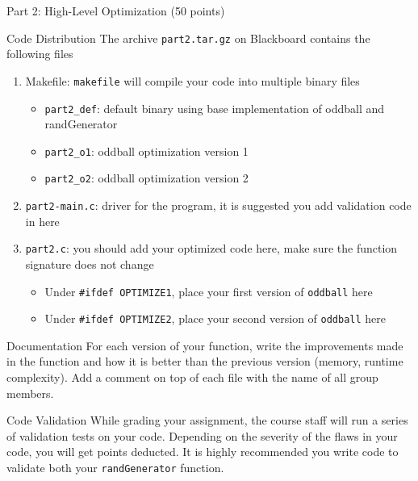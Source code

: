 \documentclass{article}
\newcommand{\asm}[1]{\texttt{#1}}
\begin{document}
\begin{section}{Part 2: High-Level Optimization (50 points)}
\begin{subsection}{Code Distribution}
The archive \asm{part2.tar.gz} on Blackboard contains the following files
\begin{enumerate}
\item Makefile: \asm{makefile} will compile your code into multiple binary files
\begin{itemize}
\item \asm{part2\_def}: default binary using base implementation of oddball and randGenerator
\item \asm{part2\_o1}: oddball optimization version 1
\item \asm{part2\_o2}: oddball optimization version 2
\end{itemize}
\item \asm{part2-main.c}: driver for the program, it is suggested you add validation code in here \\
\item \asm{part2.c}: you should add your optimized code here, make sure the function signature does not change
\begin{itemize}
\item Under \asm{\#ifdef OPTIMIZE1}, place your first version of \asm{oddball} here
\item Under \asm{\#ifdef OPTIMIZE2}, place your second version of \asm{oddball} here
\end{itemize}
\end{enumerate}
\end{subsection}
\begin{subsection}{Documentation}
For each version of your function, write the improvements made in the function and how it is better than the previous version (memory, runtime complexity). Add a comment on top of each file with the name of all group members.
\end{subsection}
\begin{subsection}{Code Validation}
While grading your assignment, the course staff will run a series of validation tests on your code.
Depending on the severity of the flaws in your code, you will get points deducted. It is highly
recommended you write code to validate both your \asm{randGenerator} function.
\end{subsection}
\end{section}
\end{document}
